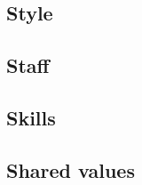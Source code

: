 \documentclass[11pt]{article} %
\begin{document}
\subsection{Style}
\subsection{Staff}
\subsection{Skills}
\subsection{Shared values}
\end{document}
